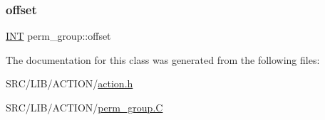\mbox{\label{classperm__group_a1ab1da81ffb5582ae40cdcb7d5c21619}} 
\subsubsection{\texorpdfstring{offset}{offset}}
{\footnotesize\ttfamily \mbox{\hyperlink{galois_8h_a09fddde158a3a20bd2dcadb609de11dc}{I\+NT}} perm\+\_\+group\+::offset}



The documentation for this class was generated from the following files\+:\begin{DoxyCompactItemize}
\item 
S\+R\+C/\+L\+I\+B/\+A\+C\+T\+I\+O\+N/\mbox{\hyperlink{action_8h}{action.\+h}}\item 
S\+R\+C/\+L\+I\+B/\+A\+C\+T\+I\+O\+N/\mbox{\hyperlink{perm__group_8_c}{perm\+\_\+group.\+C}}\end{DoxyCompactItemize}
